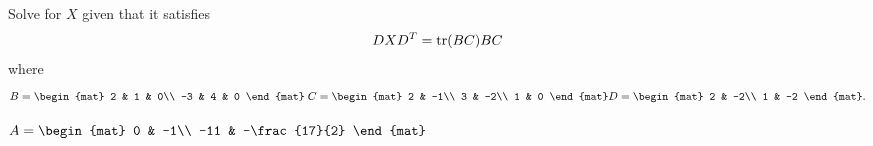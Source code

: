 
\begin{Exercise}[
name={},
title={}, 
difficulty=0,
origin={\cite{YL}}]
Solve for $X$ given that it satisfies
\[
DXD^T = \operatorname{tr}(BC)BC
\]
where
\[
B=
\begin{mat}
2 & 1 & 0\\
-3 & 4 & 0
\end{mat}\;
C=
\begin{mat}
2 & -1\\
3 & -2\\
1 & 0
\end{mat}
D=
\begin{mat}
2 & -2\\
1 & -2
\end{mat}.
\]

\end{Exercise}

\begin{Answer}
$
A=
\begin{mat}
0 & -1\\
-11 & -\frac{17}{2}
\end{mat}
$
\end{Answer}
